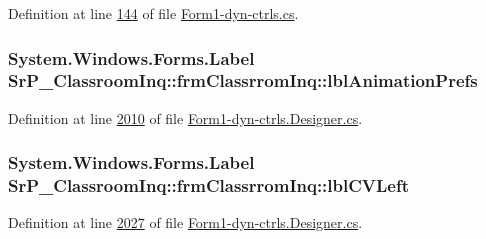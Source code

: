 \-Definition at line \hyperlink{_form1-dyn-ctrls_8cs_source_l00144}{144} of file \hyperlink{_form1-dyn-ctrls_8cs_source}{\-Form1-\/dyn-\/ctrls.\-cs}.

\hypertarget{class_sr_p___classroom_inq_1_1frm_classrrom_inq_a3e47dc47a77617c03e8c0347cdc0579b}{
\subsubsection[{lbl\-Animation\-Prefs}]{\setlength{\rightskip}{0pt plus 5cm}\-System.\-Windows.\-Forms.\-Label {\bf \-Sr\-P\-\_\-\-Classroom\-Inq\-::frm\-Classrrom\-Inq\-::lbl\-Animation\-Prefs}}}
\label{class_sr_p___classroom_inq_1_1frm_classrrom_inq_a3e47dc47a77617c03e8c0347cdc0579b}


\-Definition at line \hyperlink{_form1-dyn-ctrls_8_designer_8cs_source_l02010}{2010} of file \hyperlink{_form1-dyn-ctrls_8_designer_8cs_source}{\-Form1-\/dyn-\/ctrls.\-Designer.\-cs}.

\hypertarget{class_sr_p___classroom_inq_1_1frm_classrrom_inq_a4759549d1c3966e4a29741e486443c16}{
\subsubsection[{lbl\-C\-V\-Left}]{\setlength{\rightskip}{0pt plus 5cm}\-System.\-Windows.\-Forms.\-Label {\bf \-Sr\-P\-\_\-\-Classroom\-Inq\-::frm\-Classrrom\-Inq\-::lbl\-C\-V\-Left}}}
\label{class_sr_p___classroom_inq_1_1frm_classrrom_inq_a4759549d1c3966e4a29741e486443c16}


\-Definition at line \hyperlink{_form1-dyn-ctrls_8_designer_8cs_source_l02027}{2027} of file \hyperlink{_form1-dyn-ctrls_8_designer_8cs_source}{\-Form1-\/dyn-\/ctrls.\-Designer.\-cs}.

